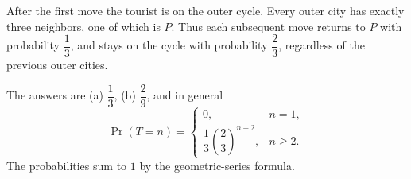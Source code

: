 After the first move the tourist is on the outer cycle. Every outer city has exactly three neighbors, one of which is $P$. Thus each subsequent move returns to $P$ with probability $\dfrac{1}{3}$, and stays on the cycle with probability $\dfrac{2}{3}$, regardless of the previous outer cities.

The answers are (a) $\boxed{\dfrac{1}{3}}$, (b) $\boxed{\dfrac{2}{9}}$, and in general
\[
\boxed{\Pr(T=n)=
\begin{cases}
0,&n=1,\\
\dfrac{1}{3}\left(\dfrac{2}{3}\right)^{n-2},&n\ge2.
\end{cases}}
\]
The probabilities sum to $1$ by the geometric-series formula.
